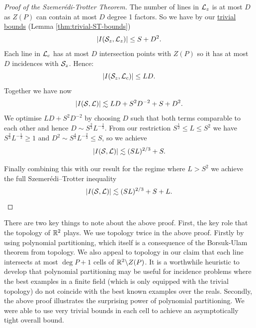 \begin{proof}[Proof of the Szemerédi-Trotter Theorem]
The number of lines in $\mathcal L_z$ is at most $D$ as $Z(P)$ can contain at most $D$ degree 1 factors. So we have by our \hyperref[thm:trivial-ST-bounds]{trivial bounds} (Lemma \ref{thm:trivial-ST-bounds})
$$|I(\mathcal S_z, \mathcal L_z)| \leq S + D^2.$$
Each line in $\mathcal L_c$ has at most $D$ intersection points with $Z(P)$ so it has at most $D$ incidences with $\mathcal S_z$. Hence:
 $$|I(\mathcal S_z, \mathcal L_c)| \leq LD.$$
Together we have now 
$$|I(\mathcal S, \mathcal L)| \lesssim LD + S^2D^{-2} +S + D^2.$$
We optimise $LD + S^2D^{-2}$ by choosing $D$ such that both terms comparable to each other and hence $D \sim S^{\frac{2}{3}} L^{-\frac{1}{3}}$. 
From our restriction $S^{\frac{1}{2}} \leq L \leq S^2$ we have $S^{\frac{2}{3}} L^{-\frac{1}{3}} \geq 1$
and $D^2 \sim S^{\frac{4}{3}} L^{-\frac{2}{3}} \leq S$, so we achieve
$$|I(\mathcal S, \mathcal L)| \lesssim (SL)^{2/3} + S. $$

Finally combining this with our result for the regime where $L>S^2$ we achieve the full Szemerédi–Trotter inequality 
\[
|I(\mathcal S,\mathcal L)| \lesssim (SL)^{2/3} + S + L.
\]
\end{proof}

There are two key things to note about the above proof. First, the key role that the topology of $\mathbb R^2$ plays. We use topology twice in the above proof. Firstly by using polynomial partitioning, which itself is a consequence of the Borsuk-Ulam theorem from topology. We also appeal to topology in our claim that each line intersects at most $\deg P +1$ cells of $\mathbb R^2 \backslash Z(P)$.  It is a worthwhile heuristic to develop that polynomial partitioning may be useful for incidence problems
where the best examples in a finite field (which is only equipped with the trivial topology) do not coincide with the best known examples over the reals.
Secondly, the above proof illustrates the surprising power of polynomial partitioning. We were able to use very trivial bounds in each cell to achieve
an asymptotically tight overall bound. 

